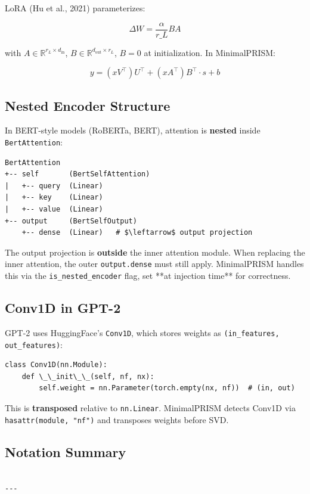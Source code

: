 LoRA (Hu et al., 2021) parameterizes:

\[
\Delta W = \frac{\alpha}{r\_L} B A
\tag{3.10}
\]

with $A \in \mathbb{R}^{r_L \times d_\text{in}}$, $B \in \mathbb{R}^{d_\text{out} \times r_L}$, 
$B = 0$ at initialization. In MinimalPRISM:

\[
y = (x V^\top) U^\top + (x A^\top) B^\top \cdot s + b
\tag{3.11}
\]

\subsection{Nested Encoder Structure}

In BERT-style models (RoBERTa, BERT), attention is \textbf{nested} inside 
\texttt{BertAttention}:

\begin{lstlisting}
BertAttention
+-- self       (BertSelfAttention)
|   +-- query  (Linear)
|   +-- key    (Linear)
|   +-- value  (Linear)
+-- output     (BertSelfOutput)
    +-- dense  (Linear)   # $\leftarrow$ output projection
\end{lstlisting}

The output projection is \textbf{outside} the inner attention module. When 
replacing the inner attention, the outer \texttt{output.dense} must still apply. 
MinimalPRISM handles this via the \texttt{is\_nested\_encoder} flag, set **at 
injection time** for correctness.

\subsection{Conv1D in GPT-2}

GPT-2 uses HuggingFace's \texttt{Conv1D}, which stores weights as 
\texttt{(in\_features, out\_features)}:

\begin{lstlisting}
class Conv1D(nn.Module):
    def \_\_init\_\_(self, nf, nx):
        self.weight = nn.Parameter(torch.empty(nx, nf))  # (in, out)
\end{lstlisting}

This is \textbf{transposed} relative to \texttt{nn.Linear}. MinimalPRISM detects 
Conv1D via \texttt{hasattr(module, "nf")} and transposes weights before SVD.

\subsection{Notation Summary}

\begin{lstlisting}

---
\end{lstlisting}